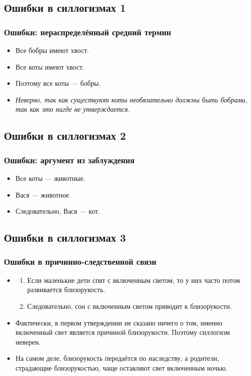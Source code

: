 \documentclass[compress,red]{beamer}
\begin{document}
\subsection{Ошибки в силлогизмах 1}
\begin{frame}[fragile]
  \frametitle{Ошибки: нераспределённый средний термин}
  \begin{itemize}
    \item Все бобры имеют хвост.
    \item Все коты имеют хвост.
    \item Поэтому все коты --- бобры.
    \item \emph{Неверно, так как существуют коты необязательно должны быть бобрами, так как это нигде не утверждается.}
  \end{itemize}
\end{frame}

\subsection{Ошибки в силлогизмах 2}
\begin{frame}[fragile]
  \frametitle{Ошибки: аргумент из заблуждения}
  \begin{itemize}
    \item Все коты --- животные.
    \item Вася --- животное.
    \item Следовательно, Вася --- кот.
  \end{itemize}
\end{frame}

\subsection{Ошибки в силлогизмах 3}
\begin{frame}[fragile]
  \frametitle{Ошибки в причинно-следственной связи}
  \begin{itemize}
    \item
    \begin{enumerate}
      \item Если маленькие дети спят с включенным светом, то у них часто потом развивается близорукость.
      \item Следовательно, сон с включенным светом приводит к близорукости.
    \end{enumerate}
    \item Фактически, в первом утверждении не сказано ничего о том, именно включенный свет является причиной близорукости. Поэтому силлогизм неверен.
    \item На самом деле, близорукость передаётся по наследству, а родители, страдающие близорукостью, чаще оставляют свет включенным ночью.
  \end{itemize}
\end{frame}
\end{document}
